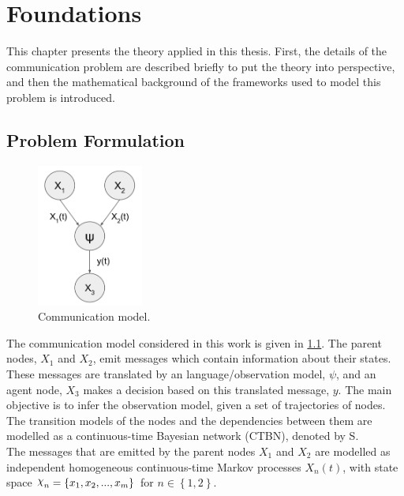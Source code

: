 \chapter{Foundations}
\label{chap:2}

This chapter presents the theory applied in this thesis. First, the details of the communication problem are described briefly to put the theory into perspective, and then the mathematical background of the frameworks used to model this problem is introduced. 

\section{Problem Formulation}
\label{sec:prob_formulation}

\begin{figure}
	\begin{center}
		\includegraphics[width=3.5cm]{figures/simple_graph}
		\caption{Communication model.}
		\label{fig:graph_model}
	\end{center}
\end{figure} 
The communication model considered in this work is given in \cref{fig:graph_model}. The parent nodes, $X_{1}$ and $ X_{2}$, emit messages which contain information about their states. These messages are translated by an language/observation model, $\psi$, and an agent node, $ X_{3} $ makes a decision based on this translated message, $ y $. The main objective is to infer the observation model, given a set of trajectories of nodes.\\
The transition models of the nodes and the dependencies between them are modelled as a continuous-time Bayesian network (CTBN), denoted by S. \\%
The messages that are emitted by the parent nodes $X_{1}$ and $ X_{2} $ are modelled as independent homogeneous continuous-time Markov processes $X_{n}(t)$, with state space $ \rchi_{n} = \left\lbrace x_{1}, x_{2}, ..., x_{m} \right\rbrace  $ for $ n \in \left\lbrace 1,2 \right\rbrace $.\\
